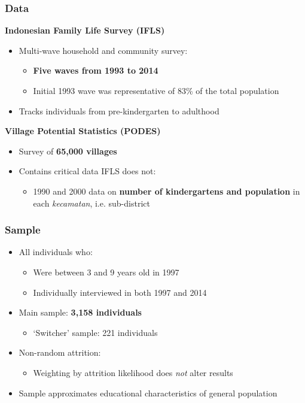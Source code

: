 \documentclass{beamer}
\begin{document}
\begin{frame}
\frametitle{Data}
\textbf{Indonesian Family Life Survey (IFLS)}
\begin{itemize}
	\item Multi-wave household and community survey:
	\begin{itemize}
		\item \textbf{Five waves from 1993 to 2014}
		\item Initial 1993 wave was representative of 83\% of the total population
	\end{itemize}
	\vspace{0.1in}
	\item Tracks individuals from pre-kindergarten to adulthood
\end{itemize}
\vspace{0.2in}
\textbf{Village Potential Statistics (PODES)}
\begin{itemize}
	\item Survey of \textbf{65,000 villages}
	\vspace{0.1in}
	\item Contains critical data IFLS does not:
	\begin{itemize}
		\item 1990 and 2000 data on \textbf{number of kindergartens and population} in each \textit{kecamatan}, i.e. sub-district
	\end{itemize}
\end{itemize}
\end{frame}

\begin{frame}
\frametitle{Sample}
\begin{itemize}
	\item All individuals who: 
	\begin{itemize}
		\item Were between 3 and 9 years old in 1997
		\item Individually interviewed in both 1997 and 2014
	\end{itemize}
	\vspace{0.1in}
	\item Main sample: \textbf{3,158 individuals}
	\begin{itemize} 
		\item `Switcher' sample: 221 individuals
	\end{itemize}
	\vspace{0.1in}
	\item Non-random attrition:
	\begin{itemize}
		\item Weighting by attrition likelihood does \textit{not} alter results
	\end{itemize}
	\vspace{0.1in}
	\item Sample approximates educational characteristics of general population
\end{itemize}
\end{frame}
\end{document}

